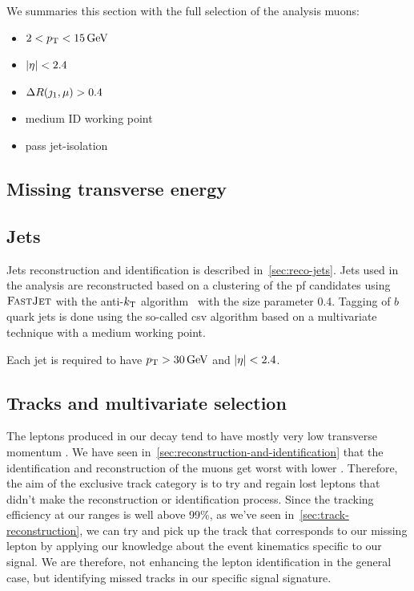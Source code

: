 We summaries this section with the full selection of the analysis muons:
\begin{itemize}[noitemsep]
\item $2<p_{\mathrm{T}}<15\,\text{Ge\hspace{-.08em}V}$
\item $\lvert \eta \rvert < 2.4$
\item $\Delta R(\jmath_1,\mu)>0.4$
\item medium ID working point
\item pass jet-isolation
\end{itemize}



\subsection{Missing transverse energy}
\label{subsec:met}

\subsection{Jets}
\label{subsec:jets}

Jets reconstruction and identification is described in~\ref{sec:reco-jets}. Jets used in the analysis are reconstructed based on a clustering of the \gls{pf} candidates using ${\textsc{FastJet}}$ with the anti-$k_{\mathrm{T}}$ algorithm~\cite{Cacciari_2008_antikt} with the size parameter 0.4. Tagging of $b$ quark jets is done using the so-called \gls{csv} algorithm based on a multivari­ate technique \DEEPCSV with a medium working point.

Each jet is required to have $p_{\mathrm{T}}>30\,\text{Ge\hspace{-.08em}V}$ and $\lvert \eta \rvert<2.4$.

\clearpage
\subsection{Tracks and multivariate selection }

The leptons \ellell produced in our decay \neuttdecay tend to have mostly very low transverse momentum \pt. We have seen in~\ref{sec:reconstruction-and-identification} that the identification and reconstruction of the muons get worst with lower \pt. Therefore, the aim of the exclusive track category is to try and regain lost leptons that didn't make the reconstruction or identification process. Since the tracking efficiency at our \pt ranges is well above 99\%, as we've seen in~\ref{sec:track-reconstruction}, we can try and pick up the track that corresponds to our missing lepton by applying our knowledge about the event kinematics specific to our signal. We are therefore, not enhancing the lepton identification in the general case, but identifying missed tracks in our specific signal signature.

